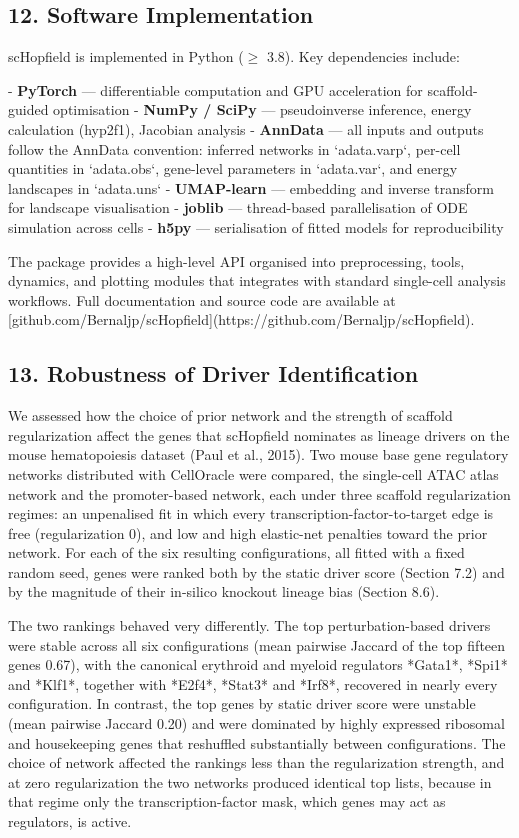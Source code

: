 \documentclass[11pt]{article}
\begin{document}
\subsection*{12. Software Implementation}

scHopfield is implemented in Python ($\geq$ 3.8). Key dependencies include:

- \textbf{PyTorch} — differentiable computation and GPU acceleration for scaffold-guided optimisation
- \textbf{NumPy / SciPy} — pseudoinverse inference, energy calculation (hyp2f1), Jacobian analysis
- \textbf{AnnData} — all inputs and outputs follow the AnnData convention: inferred networks in `adata.varp`, per-cell quantities in `adata.obs`, gene-level parameters in `adata.var`, and energy landscapes in `adata.uns`
- \textbf{UMAP-learn} — embedding and inverse transform for landscape visualisation
- \textbf{joblib} — thread-based parallelisation of ODE simulation across cells
- \textbf{h5py} — serialisation of fitted models for reproducibility

The package provides a high-level API organised into preprocessing, tools, dynamics, and plotting modules that integrates with standard single-cell analysis workflows. Full documentation and source code are available at [github.com/Bernaljp/scHopfield](https://github.com/Bernaljp/scHopfield).



\subsection*{13. Robustness of Driver Identification}

We assessed how the choice of prior network and the strength of scaffold regularization affect the genes that scHopfield nominates as lineage drivers on the mouse hematopoiesis dataset (Paul et al., 2015). Two mouse base gene regulatory networks distributed with CellOracle were compared, the single-cell ATAC atlas network and the promoter-based network, each under three scaffold regularization regimes: an unpenalised fit in which every transcription-factor-to-target edge is free (regularization 0), and low and high elastic-net penalties toward the prior network. For each of the six resulting configurations, all fitted with a fixed random seed, genes were ranked both by the static driver score (Section 7.2) and by the magnitude of their in-silico knockout lineage bias (Section 8.6).

The two rankings behaved very differently. The top perturbation-based drivers were stable across all six configurations (mean pairwise Jaccard of the top fifteen genes 0.67), with the canonical erythroid and myeloid regulators *Gata1*, *Spi1* and *Klf1*, together with *E2f4*, *Stat3* and *Irf8*, recovered in nearly every configuration. In contrast, the top genes by static driver score were unstable (mean pairwise Jaccard 0.20) and were dominated by highly expressed ribosomal and housekeeping genes that reshuffled substantially between configurations. The choice of network affected the rankings less than the regularization strength, and at zero regularization the two networks produced identical top lists, because in that regime only the transcription-factor mask, which genes may act as regulators, is active.
\end{document}
